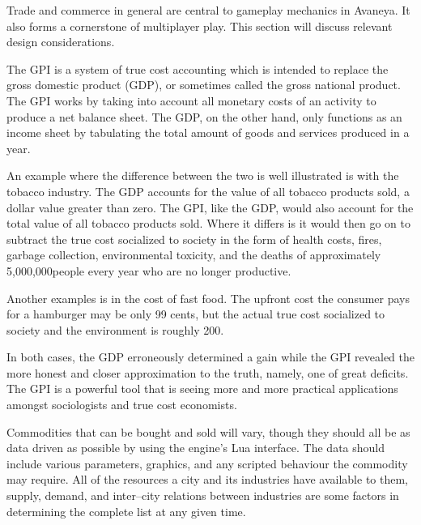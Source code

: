 

Trade and commerce in general are central to gameplay mechanics in Avaneya. It also forms a cornerstone of multiplayer play. This section will discuss relevant design considerations.

The GPI is a system of true cost accounting which is intended to replace the gross domestic product (GDP), or sometimes called the gross national product. The GPI works by taking into account all monetary costs of an activity to produce a net balance sheet. The GDP, on the other hand, only functions as an income sheet by tabulating the total amount of goods and services produced in a year.\footnotecite[cobb1999]

An example where the difference between the two is well illustrated is with the tobacco industry. The GDP accounts for the value of all tobacco products sold, a dollar value greater than zero. The GPI, like the GDP, would also account for the total value of all tobacco products sold. Where it differs is it would then go on to subtract the true cost socialized to society in the form of health costs, fires, garbage collection, environmental toxicity, and the deaths of approximately 5,000,000 people every year who are no longer productive. 

Another examples is in the cost of fast food. The upfront cost the consumer pays for a hamburger may be only 99 cents, but the actual true cost socialized to society and the environment is roughly \type{$}200.\footnotecite[extras={ p.~46.}][raj2010]

In both cases, the GDP erroneously determined a gain while the GPI revealed the more honest and closer approximation to the truth, namely, one of great deficits. The GPI is a powerful tool that is seeing more and more practical applications amongst sociologists and true cost economists.\footnotecite[costanzaa2004]

Commodities that can be bought and sold will vary, though they should all be as data driven as possible by using the engine's Lua interface. The data should include various parameters, graphics, and any scripted behaviour the commodity may require. All of the resources a city and its industries have available to them, supply, demand, and inter--city relations between industries are some factors in determining the complete list at any given time.


